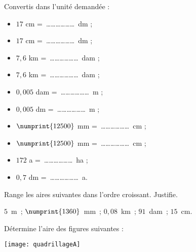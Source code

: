 \begin{exercice}
Convertis dans l’unité demandée :
\begin{itemize}
 \item $17$ cm = \ldots \ldots \ldots \ldots \ldots \ldots dm ;
 \item $17$ cm = \ldots \ldots \ldots \ldots \ldots \ldots dm ;
 \item $7,6$ km = \ldots \ldots \ldots \ldots \ldots \ldots dam ;
 \item $7,6$ km = \ldots \ldots \ldots \ldots \ldots \ldots dam ;
 \item $0,005$ dam = \ldots \ldots \ldots \ldots \ldots \ldots m ;
 \item $0,005$ dm = \ldots \ldots \ldots \ldots \ldots \ldots m ;
 \item $\numprint{12500}$ mm = \ldots \ldots \ldots \ldots \ldots \ldots cm ;
 \item $\numprint{12500}$ mm = \ldots \ldots \ldots \ldots \ldots \ldots cm ;
 \item $172$ a = \ldots \ldots \ldots \ldots \ldots \ldots ha ;
 \item $0,7$ dm = \ldots \ldots \ldots \ldots \ldots \ldots a.
 \end{itemize}
\end{exercice}


\begin{exercice}
Range les aires suivantes dans l'ordre croissant. Justifie.

\begin{center} $5$ m ; $\numprint{1360}$ mm ; $0,08$ km ; $91$ dam ; $15$ cm. \end{center}
\end{exercice}


\vspace{1em}





\begin{exercice}
Détermine l'aire des figures suivantes :

\begin{center} \texttt{[image: quadrillageA]} \end{center}
\end{exercice}


